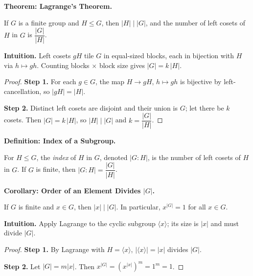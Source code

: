 \documentclass[9pt]{article}
\theoremstyle{definition}
\begin{document}
\newpage

\noindent\textbf{Theorem: Lagrange’s Theorem.}

\newpage

If $G$ is a finite group and $H\le G$, then $|H|\mid |G|$, and the number of left cosets of $H$ in $G$ is $\dfrac{|G|}{|H|}$.

\dotfill

\noindent\textbf{Intuition.}
Left cosets $gH$ tile $G$ in equal-sized blocks, each in bijection with $H$ via $h\mapsto gh$. Counting blocks $\times$ block size gives $|G|=k\,|H|$. 

\dotfill

\begin{proof}
\textbf{Step 1.} For each $g\in G$, the map $H\to gH$, $h\mapsto gh$ is bijective by left-cancellation, so $|gH|=|H|$. 

\textbf{Step 2.} Distinct left cosets are disjoint and their union is $G$; let there be $k$ cosets. Then $|G|=k\,|H|$, so $|H|\mid |G|$ and $k=\dfrac{|G|}{|H|}$.
\end{proof}

\newpage

\noindent\textbf{Definition: Index of a Subgroup.}

\newpage

For $H\le G$, the \emph{index} of $H$ in $G$, denoted $|G:H|$, is the number of left cosets of $H$ in $G$. If $G$ is finite, then $|G:H|=\dfrac{|G|}{|H|}$.

\newpage

\noindent\textbf{Corollary: Order of an Element Divides $|G|$.}

\newpage

If $G$ is finite and $x\in G$, then $|x|\mid |G|$. In particular, $x^{|G|}=1$ for all $x\in G$.

\dotfill

\noindent\textbf{Intuition.}
Apply Lagrange to the cyclic subgroup $\langle x\rangle$; its size is $|x|$ and must divide $|G|$.

\dotfill

\begin{proof}
\textbf{Step 1.} By Lagrange with $H=\langle x\rangle$, $|\langle x\rangle|=|x|$ divides $|G|$. 

\textbf{Step 2.} Let $|G|=m|x|$. Then $x^{|G|}=(x^{|x|})^{m}=1^{m}=1$.
\end{proof}
\end{document}
